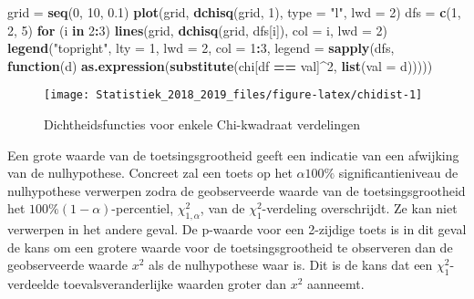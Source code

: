 \documentclass[12pt,dutch,coursenotes]{book}
\newenvironment{Shaded}{\begin{snugshade}}{\end{snugshade}}
\newcommand{\KeywordTok}[1]{\textcolor[rgb]{0.13,0.29,0.53}{\textbf{#1}}}
\newcommand{\DataTypeTok}[1]{\textcolor[rgb]{0.13,0.29,0.53}{#1}}
\newcommand{\DecValTok}[1]{\textcolor[rgb]{0.00,0.00,0.81}{#1}}
\newcommand{\FloatTok}[1]{\textcolor[rgb]{0.00,0.00,0.81}{#1}}
\newcommand{\StringTok}[1]{\textcolor[rgb]{0.31,0.60,0.02}{#1}}
\newcommand{\ControlFlowTok}[1]{\textcolor[rgb]{0.13,0.29,0.53}{\textbf{#1}}}
\newcommand{\OperatorTok}[1]{\textcolor[rgb]{0.81,0.36,0.00}{\textbf{#1}}}
\newcommand{\NormalTok}[1]{#1}
\theoremstyle{definition}
\theoremstyle{definition}
\theoremstyle{definition}
\theoremstyle{remark}
\begin{document}
\begin{Shaded}
\begin{Highlighting}[]
\NormalTok{grid =}\StringTok{ }\KeywordTok{seq}\NormalTok{(}\DecValTok{0}\NormalTok{, }\DecValTok{10}\NormalTok{, }\FloatTok{0.1}\NormalTok{)}
\KeywordTok{plot}\NormalTok{(grid, }\KeywordTok{dchisq}\NormalTok{(grid, }\DecValTok{1}\NormalTok{), }\DataTypeTok{type =} \StringTok{"l"}\NormalTok{, }\DataTypeTok{lwd =} \DecValTok{2}\NormalTok{)}
\NormalTok{dfs =}\StringTok{ }\KeywordTok{c}\NormalTok{(}\DecValTok{1}\NormalTok{, }\DecValTok{2}\NormalTok{, }\DecValTok{5}\NormalTok{)}
\ControlFlowTok{for}\NormalTok{ (i }\ControlFlowTok{in} \DecValTok{2}\OperatorTok{:}\DecValTok{3}\NormalTok{) }\KeywordTok{lines}\NormalTok{(grid, }\KeywordTok{dchisq}\NormalTok{(grid, dfs[i]), }\DataTypeTok{col =}\NormalTok{ i, }
    \DataTypeTok{lwd =} \DecValTok{2}\NormalTok{)}
\KeywordTok{legend}\NormalTok{(}\StringTok{"topright"}\NormalTok{, }\DataTypeTok{lty =} \DecValTok{1}\NormalTok{, }\DataTypeTok{lwd =} \DecValTok{2}\NormalTok{, }\DataTypeTok{col =} \DecValTok{1}\OperatorTok{:}\DecValTok{3}\NormalTok{, }\DataTypeTok{legend =} \KeywordTok{sapply}\NormalTok{(dfs, }
    \ControlFlowTok{function}\NormalTok{(d) }\KeywordTok{as.expression}\NormalTok{(}\KeywordTok{substitute}\NormalTok{(chi[df }\OperatorTok{==}\StringTok{ }
\StringTok{        }\NormalTok{val]}\OperatorTok{^}\DecValTok{2}\NormalTok{, }\KeywordTok{list}\NormalTok{(}\DataTypeTok{val =}\NormalTok{ d)))))}
\end{Highlighting}
\end{Shaded}

\begin{figure}

{\centering \texttt{[image: Statistiek\_2018\_2019\_files/figure-latex/chidist-1]} 

}

\caption{Dichtheidsfuncties voor enkele Chi-kwadraat verdelingen}\label{fig:chidist}
\end{figure}

Een grote waarde van de toetsingsgrootheid geeft een indicatie van een
afwijking van de nulhypothese. Concreet zal een toets op het
\(\alpha 100\%\) significantieniveau de nulhypothese verwerpen zodra de
geobserveerde waarde van de toetsingsgrootheid het
\(100\%(1-\alpha)\)-percentiel, \(\chi^2_{1, \alpha}\), van de
\(\chi^2_1\)-verdeling overschrijdt. Ze kan niet verwerpen in het andere
geval. De p-waarde voor een 2-zijdige toets is in dit geval de kans om
een grotere waarde voor de toetsingsgrootheid te observeren dan de
geobserveerde waarde \(x^2\) als de nulhypothese waar is. Dit is de kans
dat een \(\chi^2_1\)-verdeelde toevalsveranderlijke waarden groter dan
\(x^2\) aanneemt.
\end{document}
